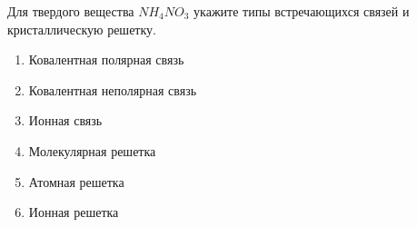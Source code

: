 
Для твердого вещества $NH_4NO_3$
 укажите типы
встречающихся связей и кристаллическую решетку.

\begin{enumerate}
    \item Ковалентная полярная связь
    \item Ковалентная неполярная связь
    \item Ионная связь
    \item Молекулярная решетка
    \item Атомная решетка
    \item Ионная решетка
\end{enumerate}



